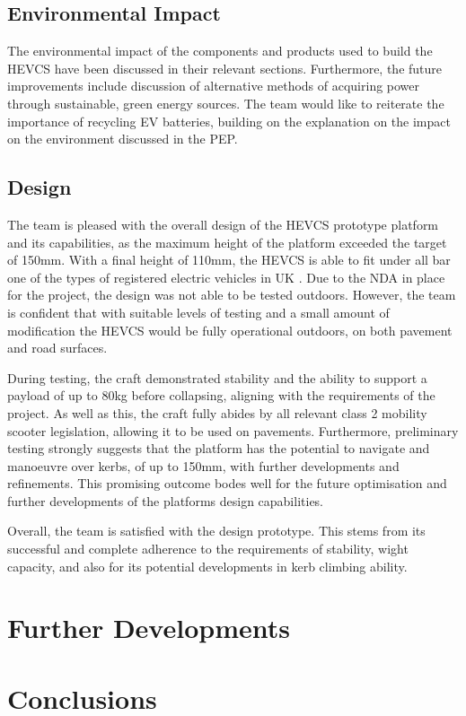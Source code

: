 \documentclass [12pt]{article}
\begin{document}
\subsection{Environmental Impact}

The environmental impact of the components and products used to build the HEVCS have been discussed in their relevant sections. Furthermore, the future improvements include discussion of alternative methods of acquiring power through sustainable, green energy sources. The team would like to reiterate the importance of recycling EV batteries, building on the explanation on the impact on the environment discussed in the PEP. 

\subsection{Design}

The team is pleased with the overall design of the HEVCS prototype platform and its capabilities, as the maximum height of the platform exceeded the target of 150mm. With a final height of 110mm, the HEVCS is able to fit under all bar one of the types of registered electric vehicles in UK \cite{carsinit}. Due to the NDA in place for the project, the design was not able to be tested outdoors. However, the team is confident that with suitable levels of testing and a small amount of modification the HEVCS would be fully operational outdoors, on both pavement and road surfaces.  

During testing, the craft demonstrated stability and the ability to support a payload of up to 80kg before collapsing, aligning with the requirements of the project. As well as this, the craft fully abides by all relevant class 2 mobility scooter legislation, allowing it to be used on pavements.  Furthermore, preliminary testing strongly suggests that the platform has the potential to navigate and manoeuvre over kerbs, of up to 150mm, with further developments and refinements. This promising outcome bodes well for the future optimisation and further developments of the platforms design capabilities.  

Overall, the team is satisfied with the design prototype. This stems from its successful and complete adherence to the requirements of stability, wight capacity, and also for its potential developments in kerb climbing ability.  

\newpage
\section{Further Developments}

\newpage
\section{Conclusions}

\newpage



\appendix
\end{document}
